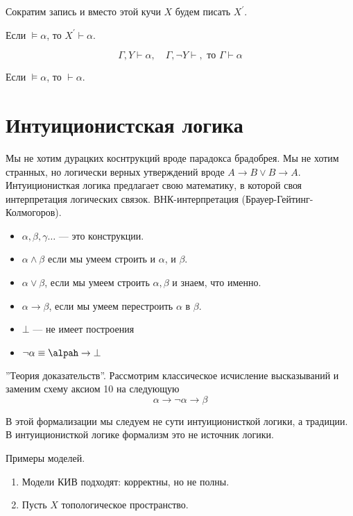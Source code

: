 Сократим запись и вместо этой кучи $X$ будем писать $X^\prime$.
\begin{lemma}
    Если $\vDash \alpha$, то $X^\prime \vdash \alpha$.
\end{lemma}

\begin{lemma}
    \[ \Gamma, Y \vdash \alpha, \quad \Gamma, \neg Y \vdash, \text{ то } \Gamma \vdash \alpha \]
\end{lemma}

\begin{theorem}
    Если $\vDash \alpha$, то $\vdash \alpha$.
\end{theorem}

\section{Интуиционистская логика}
Мы не хотим дурацких коснтрукций вроде парадокса брадобрея.
Мы не хотим странных, но логически верных утверждений вроде $A\to B \lor B \to A$.
Интуиционисткая логика предлагает свою математику, в которой своя интерпретация логических связок.
ВНК-интерпретация (Брауер-Гейтинг-Колмогоров).

\begin{itemize}\itemsep=-1mm
    \item $\alpha, \beta, \gamma \ldots$ --- это конструкции.
    \item $\alpha \land \beta$ если мы умеем строить и $\alpha$, и $\beta$.
    \item $\alpha \lor \beta$, если мы умеем строить $\alpha, \beta$ и знаем, что именно.
    \item $\alpha \to \beta$, если мы умеем перестроить $\alpha$ в $\beta$.
    \item $\bot $ --- не имеет построения
    \item $\neg \alpha \equiv \alpah \to \bot$   
\end{itemize}

''Теория доказательств''.
Рассмотрим классическое исчисление высказываний и заменим схему аксиом 10 на следующую 
\[ \alpha \to \neg \alpha \to \beta \] 

В этой формализации мы следуем не сути интуиционисткой логики, а традиции.
В интуиционисткой логике формализм это не источник логики.

Примеры моделей.
\begin{enumerate}
    \item Модели КИВ подходят: корректны, но не полны.
    \item Пусть $X$ топологическое пространство.
\end{enumerate}


\endinput
